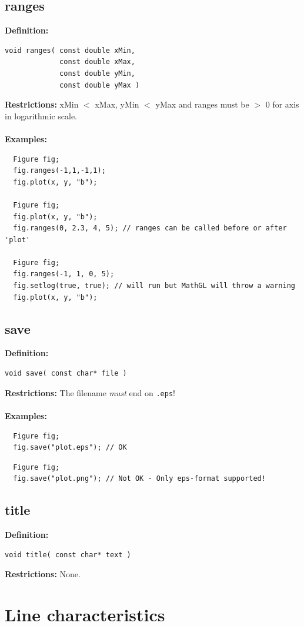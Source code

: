 \documentclass[a4paper]{article}
\newcommand{\command}[1]{\subsection{#1}}
\begin{document}
\command{ranges}

\textbf{Definition:}
\begin{lstlisting}
void ranges( const double xMin, 
             const double xMax, 
             const double yMin, 
             const double yMax )
\end{lstlisting}
%
\textbf{Restrictions:} xMin $<$ xMax, yMin $<$ yMax and ranges must be $>$ 0 for axis in logarithmic scale. \\ \\
%
\textbf{Examples:}
\begin{lstlisting}
  Figure fig;
  fig.ranges(-1,1,-1,1);
  fig.plot(x, y, "b");

  Figure fig;
  fig.plot(x, y, "b");
  fig.ranges(0, 2.3, 4, 5); // ranges can be called before or after 'plot'

  Figure fig;
  fig.ranges(-1, 1, 0, 5);
  fig.setlog(true, true); // will run but MathGL will throw a warning 
  fig.plot(x, y, "b");
\end{lstlisting}

\newpage
\command{save}

\textbf{Definition:}
\begin{lstlisting}
void save( const char* file )
\end{lstlisting}
%
\textbf{Restrictions:} The filename \textit{must} end on \texttt{.eps}! \\ \\
%
\textbf{Examples:}
\begin{lstlisting}
  Figure fig;
  fig.save("plot.eps"); // OK
\end{lstlisting}
\begin{lstlisting}
  Figure fig;
  fig.save("plot.png"); // Not OK - Only eps-format supported!
\end{lstlisting}

\command{title}

\textbf{Definition:}
\begin{lstlisting}
void title( const char* text )
\end{lstlisting}
%
\textbf{Restrictions:} None.

\section{Line characteristics}
\end{document}

